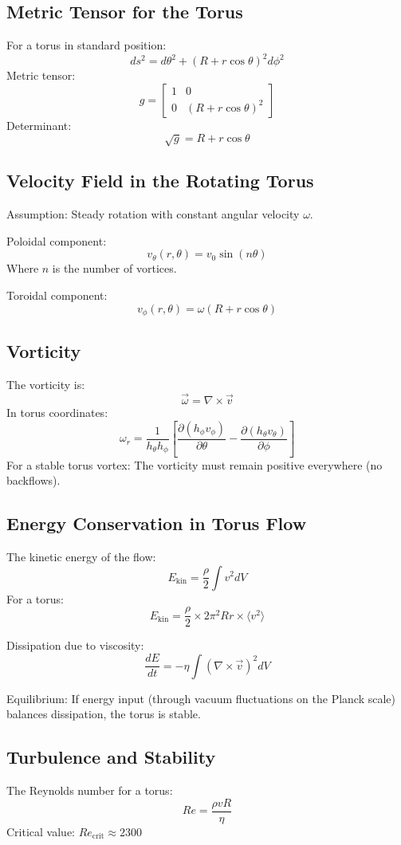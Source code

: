 \subsection{Metric Tensor for the Torus}
For a torus in standard position:
\[
ds^2 = d\theta^2 + (R + r \cos \theta)^2 d\phi^2
\]
Metric tensor:
\[
g = \begin{bmatrix}
	1 & 0 \\
	0 & (R + r \cos \theta)^2
\end{bmatrix}
\]
Determinant:
\[
\sqrt{g} = R + r \cos \theta
\]

\subsection{Velocity Field in the Rotating Torus}
Assumption: Steady rotation with constant angular velocity \( \omega \).

Poloidal component:
\[
v_\theta(r, \theta) = v_0 \sin(n \theta)
\]
Where \( n \) is the number of vortices.

Toroidal component:
\[
v_\phi(r, \theta) = \omega (R + r \cos \theta)
\]

\subsection{Vorticity}
The vorticity is:
\[
\vec{\omega} = \nabla \times \vec{v}
\]
In torus coordinates:
\[
\omega_r = \frac{1}{h_\theta h_\phi} \left[ \frac{\partial (h_\phi v_\phi)}{\partial \theta} - \frac{\partial (h_\theta v_\theta)}{\partial \phi} \right]
\]
For a stable torus vortex: The vorticity must remain positive everywhere (no backflows).

\subsection{Energy Conservation in Torus Flow}
The kinetic energy of the flow:
\[
E_{\text{kin}} = \frac{\rho}{2} \int v^2 dV
\]
For a torus:
\[
E_{\text{kin}} = \frac{\rho}{2} \times 2\pi^2 R r \times \langle v^2 \rangle
\]

Dissipation due to viscosity:
\[
\frac{dE}{dt} = -\eta \int (\nabla \times \vec{v})^2 dV
\]

Equilibrium: If energy input (through vacuum fluctuations on the Planck scale) balances dissipation, the torus is stable.

\subsection{Turbulence and Stability}
The Reynolds number for a torus:
\[
Re = \frac{\rho v R}{\eta}
\]
Critical value: \( Re_{\text{crit}} \approx 2300 \)

